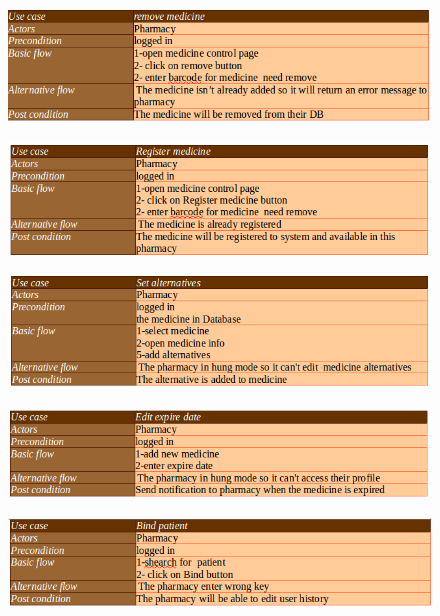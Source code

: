 \documentclass[]{article}
\begin{document}
\begin{figure}[H]
\centering
\includegraphics[scale=0.4]{./scenario/22}
\end{figure}
\begin{figure}[H]
\centering
\includegraphics[scale=0.4]{./scenario/23}
\end{figure}
\begin{figure}[H]
\centering
\includegraphics[scale=0.4]{./scenario/24}
\end{figure}
\begin{figure}[H]
\centering
\includegraphics[scale=0.4]{./scenario/25}
\end{figure}
\begin{figure}[H]
\centering
\includegraphics[scale=0.4]{./scenario/26}
\end{figure}
\end{document}
